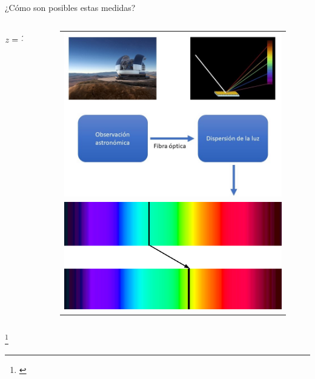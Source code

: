 \documentclass[handout]{beamer}
\newcommand\blfootnote[1]
{%
	\begingroup
	\renewcommand\thefootnote{}\footnote{#1}%
	\addtocounter{footnote}{-1}%
	\endgroup
}
\newcommand{\fcite}[1]{\blfootnote{\cite{#1}}}
\begin{document}
\begin{frame}{¿Cómo son posibles estas medidas?}
	\begin{columns}
		\begin{column}{.3\textwidth}
			\vspace{5cm}
			\begin{equation}\small
				z = \dfrac{\lambda - \lambda_0}{\lambda_0}
			\end{equation}
		\end{column}
		\begin{column}{.6\textwidth}
			\begin{figure}[h]
				\centering
				\begin{tabular}{c}
					\includegraphics[height=0.5\textheight]{sources/images/measuring1.jpg} \\
					\includegraphics[width=0.6\linewidth]{sources/images/shift.jpg}
				\end{tabular}
			\end{figure}
		\end{column}
	\end{columns}
	\fcite{shirasaki2015probing}
\end{frame}
\end{document}
